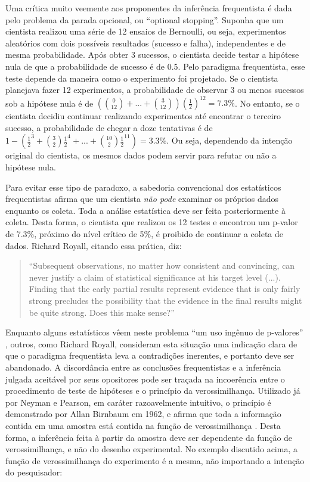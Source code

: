 Uma crítica muito veemente aos proponentes da inferência frequentista é dada pelo problema da parada opcional, ou 
``optional stopping''. Suponha que um cientista realizou uma série de 12 ensaios de Bernoulli, ou seja, experimentos aleatórios
com dois possíveis resultados (sucesso e falha), independentes e de mesma probabilidade. Após obter 3 sucessos, o cientista
decide testar a hipótese nula de que a probabilidade de sucesso é de 0.5. Pelo paradigma frequentista, esse teste depende
da maneira como o experimento foi projetado. Se o cientista planejava fazer 12 experimentos, a probabilidade de observar 3
ou menos sucessos sob a hipótese nula é de $ \left( {0 \choose 12} + ... + {3 \choose 12}\right) (\frac{1}{2})^{12} = 7.3\%$. 
No entanto, se o cientista decidiu continuar realizando experimentos até
encontrar o terceiro sucesso, a probabilidade de chegar a doze tentativas é de 
$1 - \left( \frac{1}{2}^3 + {3 \choose 2} \frac{1}{2}^4 + ... + {10 \choose 2} \frac{1}{2}^{11}\right) = 3.3\%$. Ou seja,
dependendo da intenção original do cientista, os mesmos dados podem servir para refutar ou não a hipótese nula.

Para evitar esse tipo de  paradoxo, a sabedoria convencional dos estatísticos frequentistas afirma que um cientista {\em não pode}
examinar os próprios dados enquanto os coleta. Toda a análise estatística deve ser feita posteriormente à coleta. 
Desta forma, o cientista que realizou os 12 testes e encontrou um p-valor de 7.3\%, próximo do nível crítico de 5\%, é
proibido de continuar a coleta de dados. Richard Royall, citando essa prática, diz:

\begin{quote}
``Subsequent observations, no matter how consistent and convincing, can never justify a claim of statistical significance
at his target level (...). Finding that the early partial results represent evidence that is only fairly strong precludes
the possibility that the evidence in the final results might be quite strong. Does this make sense?'' \citep{Royall97}
\end{quote}

Enquanto alguns estatísticos vêem neste problema ``um uso ingênuo de p-valores'' \citep{Good92}, outros, como Richard Royall,
consideram esta situação uma indicação clara de que o paradigma frequentista leva a contradições inerentes, e portanto 
deve ser abandonado. A discordância entre as conclusões frequentistas e a inferência julgada aceitável por seus opositores 
pode ser traçada na incoerência entre
o procedimento de teste de hipóteses e o princípio da verossimilhança. Utilizado já por Neyman e Pearson\citep{Neyman1933},
em caráter razoavelmente intuitivo, o princípio é demonstrado por Allan Birnbaum em 1962, 
e afirma que toda a informação contida em uma amostra está	contida na função de verossimilhança \citep{Birnbaum62}. 
Desta forma, a inferência feita à partir da amostra deve ser dependente da função de verossimilhança, e não do desenho
experimental.
No exemplo discutido acima, a função de verossimilhança do experimento é a mesma, não importando a intenção do pesquisador:

